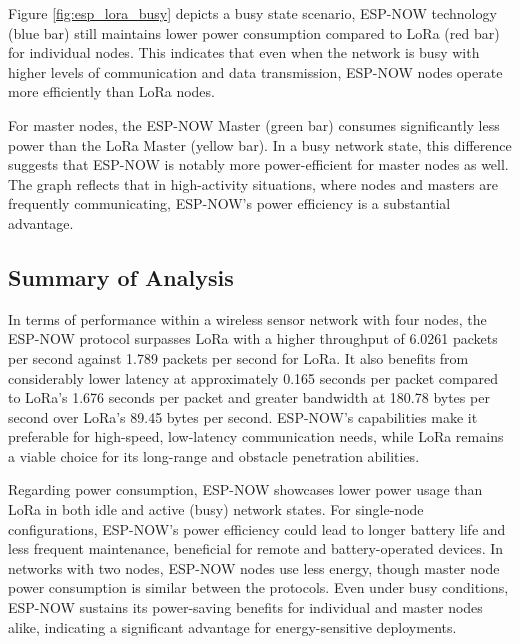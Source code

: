 Figure \ref{fig:esp_lora_busy} depicts a busy state scenario, ESP-NOW technology (blue bar) still maintains lower power consumption compared to LoRa (red bar) for individual nodes. This indicates that even when the network is busy with higher levels of communication and data transmission, ESP-NOW nodes operate more efficiently than LoRa nodes.

For master nodes, the ESP-NOW Master (green bar) consumes significantly less power than the LoRa Master (yellow bar). In a busy network state, this difference suggests that ESP-NOW is notably more power-efficient for master nodes as well. The graph reflects that in high-activity situations, where nodes and masters are frequently communicating, ESP-NOW's power efficiency is a substantial advantage.

\subsection{Summary of Analysis}\label{analysis_summary}

In terms of performance within a wireless sensor network with four nodes, the ESP-NOW protocol surpasses LoRa with a higher throughput of 6.0261 packets per second against 1.789 packets per second for LoRa. It also benefits from considerably lower latency at approximately 0.165 seconds per packet compared to LoRa’s 1.676 seconds per packet and greater bandwidth at 180.78 bytes per second over LoRa’s 89.45 bytes per second. ESP-NOW’s capabilities make it preferable for high-speed, low-latency communication needs, while LoRa remains a viable choice for its long-range and obstacle penetration abilities.

Regarding power consumption, ESP-NOW showcases lower power usage than LoRa in both idle and active (busy) network states. For single-node configurations, ESP-NOW's power efficiency could lead to longer battery life and less frequent maintenance, beneficial for remote and battery-operated devices. In networks with two nodes, ESP-NOW nodes use less energy, though master node power consumption is similar between the protocols. Even under busy conditions, ESP-NOW sustains its power-saving benefits for individual and master nodes alike, indicating a significant advantage for energy-sensitive deployments.



